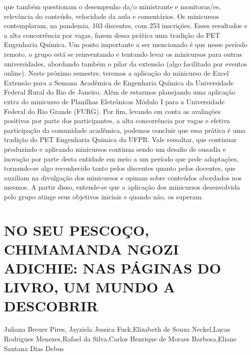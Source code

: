 que também questionam o desempenho da/o ministrante e monitoras/es, relevância do conteúdo,
velocidade da aula e comentários. Os minicursos contemplaram, na pandemia, 103 discentes,
com 253 inscrições. Esses resultados e a alta concorrência por vagas, fazem dessa prática uma
tradição do PET Engenharia Química. Um ponto importante a ser mencionado é que nesse
período remoto, o grupo está se reinventando e tentando levar os minicursos para outras
universidades, abordando também o pilar da extensão (algo facilitado por eventos online). Neste
próximo semestre, teremos a aplicação do minicurso de Excel Extensão para a Semana
Acadêmica de Engenharia Química da Universidade Federal Rural do Rio de Janeiro. Além de
estarmos planejando uma aplicação extra do minicurso de Planilhas Eletrônicas Módulo I para a
Universidade Federal do Rio Grande (FURG).
Por fim, levando em conta as avaliações positivas por parte dos participantes, a alta
concorrência por vagas e efetiva participação da comunidade acadêmica, podemos concluir que
essa prática é uma tradição do PET Engenharia Química da UFPR. Vale ressaltar, que continuar
produzindo e aplicando minicursos continua sendo um desafio de ousadia e inovação por parte
desta entidade em meio a um período que pede adaptações, tornando-se algo reconhecido tanto
pelos discentes quanto pelos docentes, que auxiliam na divulgação dos minicursos e opinam
sobre conteúdos abordados nos mesmos. A partir disso, entende-se que a aplicação dos
minicursos desenvolvida pelo grupo atinge seus objetivos iniciais e quando não, os superam.



\section{NO SEU PESCOÇO, CHIMAMANDA NGOZI ADICHIE: NAS PÁGINAS DO LIVRO, UM  MUNDO A DESCOBRIR}

Juliana Breuer Pires, Jayziela Jessica Fuck,Elizabeth de  Souza Neckel,Lucas Rodrigues Menezes,Rafael da Silva,Carlos Henrique de Moraes Barbosa,Eliane Santana Dias Debus

